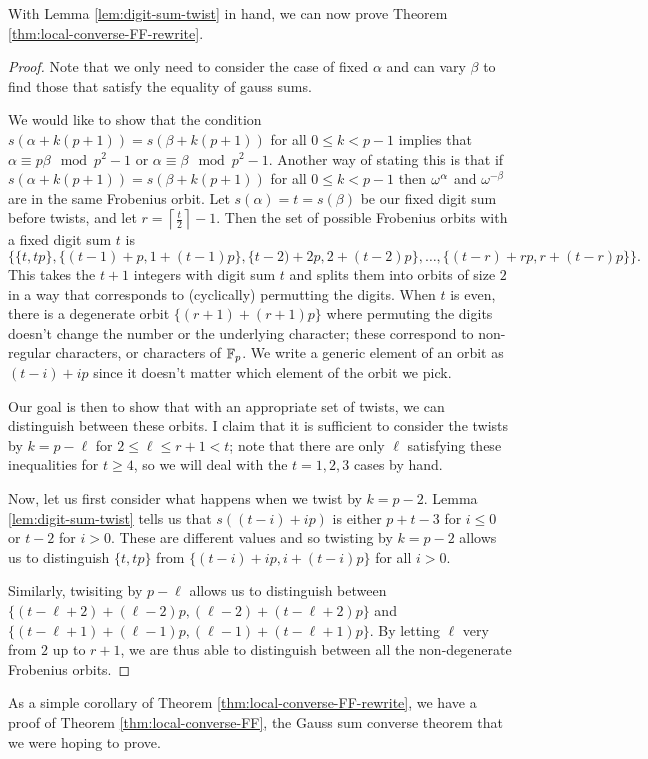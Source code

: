 With Lemma \ref{lem:digit-sum-twist} in hand, we can now prove Theorem \ref{thm:local-converse-FF-rewrite}.
\begin{proof}
Note that we only need to consider the case of fixed $\alpha$ and can vary $\beta$ to find those that satisfy the equality of gauss sums. 

We would like to show that the condition $s(\alpha + k(p+1)) = s(\beta + k(p+1))$ for all $0 \leq k < p-1$ implies that $\alpha \equiv p \beta \mod p^2 -1$ or $\alpha \equiv \beta \mod p^2 - 1$. 
Another way of stating this is that if $s(\alpha + k(p+1)) = s(\beta+k(p+1))$ for all $0 \leq k < p-1$ then $\omega^{\-\alpha}$ and $\omega^{-\beta}$ are in the same Frobenius orbit.
Let $s(\alpha) = t = s(\beta)$ be our fixed digit sum before twists, and let $r = \left \lceil \frac{t}{2} \right \rceil - 1$.
Then the set of possible Frobenius orbits with a fixed digit sum $t$ is 
\[\{\{t,tp\}, \{(t-1)+p, 1 + (t-1)p\},\{t-2)+2p, 2+(t-2)p\}, \ldots, \{(t-r)+rp, r + (t-r)p\}\}.\]
This takes the $t+1$ integers with digit sum $t$ and splits them into orbits of size $2$ in a way that corresponds to (cyclically) permutting the digits.
When $t$ is even, there is a degenerate orbit $\{(r+1)+(r+1)p\}$ where permuting the digits doesn't change the number or the underlying character; these correspond to non-regular characters, or characters of $\mathbb{F}_p$.
We write a generic element of an orbit as $(t - i) +ip$ since it doesn't matter which element of the orbit we pick.

Our goal is then to show that with an appropriate set of twists, we can distinguish between these orbits.
I claim that it is sufficient to consider the twists by $k = p - \ell$ for $2 \leq \ell \leq r +1 < t$; note that there are only $\ell$ satisfying these inequalities for $t \geq 4$, so we will deal with the $t = 1,2,3$ cases by hand.


Now, let us first consider what happens when we twist by $k = p-2$.
Lemma \ref{lem:digit-sum-twist} tells us that $s((t-i)+ip)$ is either $p+t-3$ for $i \leq 0$ or $t - 2$ for $i > 0$.
These are different values and so twisting by $k = p-2$ allows us to distinguish $\{t,tp\}$ from $\{(t-i)+ip,i+(t-i)p\}$ for all $i > 0$.

Similarly, twisiting by $p - \ell$ allows us to distinguish between $\{(t-\ell+2)+(\ell-2)p,(\ell-2) + (t-\ell+2)p\}$ and $\{(t-\ell+1)+(\ell-1)p,(\ell-1)+(t-\ell+1)p\}$. By letting $\ell$ very from $2$ up to $r+1$, we are thus able to distinguish between all the non-degenerate Frobenius orbits.
\end{proof}

As a simple corollary of Theorem \ref{thm:local-converse-FF-rewrite}, we have a proof of Theorem \ref{thm:local-converse-FF}, the Gauss sum converse theorem that we were hoping to prove.


\endinput
